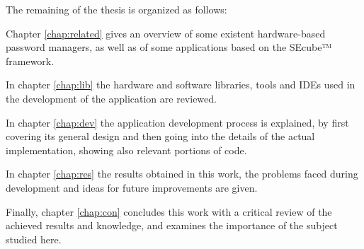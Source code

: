 The remaining of the thesis is organized as follows: 

Chapter \ref{chap:related} gives an overview of some existent hardware-based password managers, as well as of some applications based on the SEcube™ framework. 

In chapter \ref{chap:lib} the hardware and software libraries, tools and IDEs used in the development of the application are reviewed.

In chapter \ref{chap:dev} the application development process is explained, by first covering its general design and then going into the details of the actual implementation, showing also relevant portions of code. 

In chapter \ref{chap:res} the results obtained in this work, the problems faced during development and ideas for future improvements are given.

Finally, chapter \ref{chap:con} concludes this work with a critical review of the achieved results and knowledge, and examines the importance of the subject studied here.
